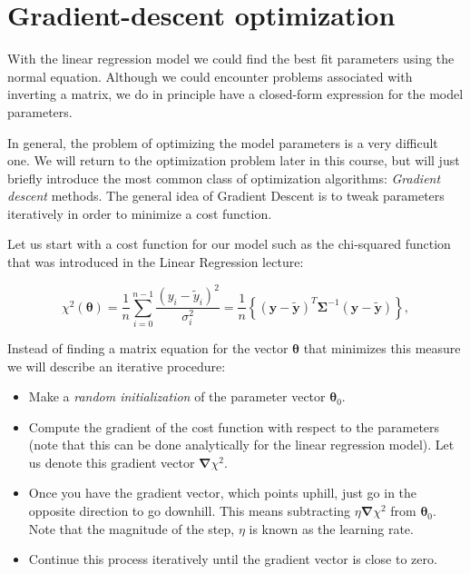 \documentclass[%
oneside,                 %
final,                   %
10pt]{article}
\begin{document}
\noindent
\section{Gradient-descent optimization}

With the linear regression model we could find the best fit parameters using the normal equation. Although we could encounter problems associated with inverting a matrix, we do in principle have a closed-form expression for the model parameters.

In general, the problem of optimizing the model parameters is a very difficult one. We will return to the optimization problem later in this course, but will just briefly introduce the most common class of optimization algorithms: \emph{Gradient descent} methods. The general idea of Gradient Descent is to tweak parameters iteratively in order to minimize a cost function.

Let us start with a cost function for our model such as the chi-squared function that was introduced in the Linear Regression lecture:

\[
\chi^2(\bm{\theta})=\frac{1}{n}\sum_{i=0}^{n-1}\frac{\left(y_i-\tilde{y}_i\right)^2}{\sigma_i^2}=\frac{1}{n}\left\{\left(\bm{y}-\bm{\tilde{y}}\right)^T \bm{\Sigma}^{-1}\left(\bm{y}-\bm{\tilde{y}}\right)\right\},
\]

Instead of finding a matrix equation for the vector $\bm{\theta}$ that minimizes this measure we will describe an iterative procedure:

\begin{itemize}
\item Make a \emph{random initialization} of the parameter vector $\bm{\theta}_0$.

\item Compute the gradient of the cost function with respect to the parameters (note that this can be done analytically for the linear regression model). Let us denote this gradient vector $\bm{\nabla} \chi^2$.

\item Once you have the gradient vector, which points uphill, just go in the opposite direction to go downhill. This means subtracting $\eta \bm{\nabla} \chi^2$ from $\bm{\theta}_0$. Note that the magnitude of the step, $\eta$ is known as the learning rate.

\item Continue this process iteratively until the gradient vector is close to zero.
\end{itemize}
\end{document}
